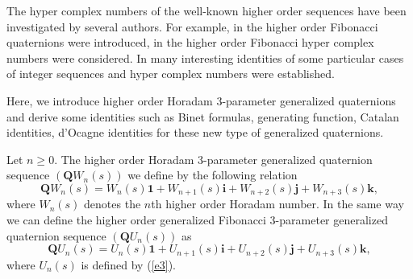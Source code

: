 \documentclass{kms-c}
\theoremstyle{plain}
\theoremstyle{definition}
\theoremstyle{remark}
\begin{document}
The hyper complex numbers of the well-known higher order sequences have been investigated by several authors. For example, in \cite{Ki1} the higher order Fibonacci quaternions were introduced, in \cite{Ki2} the higher order Fibonacci hyper complex numbers were considered. In \cite{Ay,Ha,Ku,Ozi1,Ozi2,Ozk,Po,Uy} many interesting identities of some particular cases of integer sequences and hyper complex numbers  were established.

Here, we introduce higher order Horadam 3-parameter generalized quaternions and derive some identities such as Binet formulas, generating function, Catalan identities, d'Ocagne identities for these new type of generalized quaternions.

Let $n\geq 0$. The higher order Horadam 3-parameter generalized quaternion sequence $\left(\textbf{Q}W_{n}(s)\right)$ we define by the following relation
\begin{equation}\label{f1}
\textbf{Q}W_{n}(s)=W_{n}(s)\textbf{1}+W_{n+1}(s)\textbf{i}+W_{n+2}(s)\textbf{j}+W_{n+3}(s)\textbf{k},
\end{equation}
where $W_{n}(s)$ denotes the $n$th higher order Horadam number. In the same way we can define the higher order generalized Fibonacci 3-parameter generalized quaternion sequence  $\left(\textbf{Q}U_{n}(s)\right)$ as
\begin{equation}\label{f2}
\textbf{Q}U_{n}(s)=U_{n}(s)\textbf{1}+U_{n+1}(s)\textbf{i}+U_{n+2}(s)\textbf{j}+U_{n+3}(s)\textbf{k},
\end{equation}
where $U_{n}(s)$ is defined by (\ref{e3}).
\end{document}
